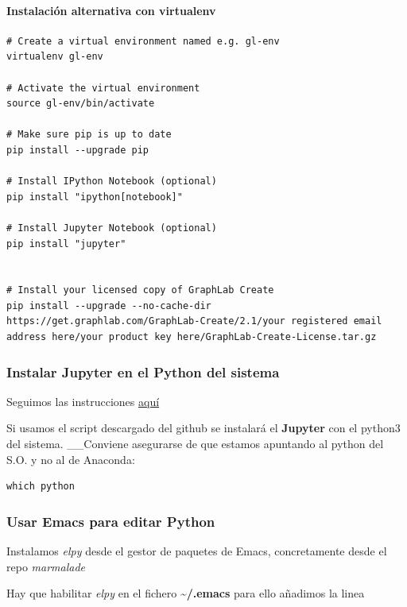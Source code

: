 \documentclass[12pt,spanish,]{scrartcl}
\let\oldparagraph\paragraph
\renewcommand{\paragraph}[1]{\oldparagraph{#1}\mbox{}}
\begin{document}
\paragraph{Instalación alternativa con
virtualenv}\label{instalaciuxf3n-alternativa-con-virtualenv}

\begin{verbatim}
# Create a virtual environment named e.g. gl-env
virtualenv gl-env

# Activate the virtual environment
source gl-env/bin/activate

# Make sure pip is up to date
pip install --upgrade pip

# Install IPython Notebook (optional)
pip install "ipython[notebook]"

# Install Jupyter Notebook (optional)
pip install "jupyter"


# Install your licensed copy of GraphLab Create
pip install --upgrade --no-cache-dir https://get.graphlab.com/GraphLab-Create/2.1/your registered email address here/your product key here/GraphLab-Create-License.tar.gz
\end{verbatim}

\subsubsection{Instalar Jupyter en el Python del
sistema}\label{instalar-jupyter-en-el-python-del-sistema}

Seguimos las instrucciones
\href{https://gist.github.com/frgomes/24c1923f2c9f14a27b14}{aquí}

Si usamos el script descargado del github se instalará el
\textbf{Jupyter} con el python3 del sistema. \_\_Conviene asegurarse de
que estamos apuntando al python del S.O. y no al de Anaconda:

\begin{verbatim}
which python
\end{verbatim}

\subsubsection{Usar Emacs para editar
Python}\label{usar-emacs-para-editar-python}

Instalamos \emph{elpy} desde el gestor de paquetes de Emacs,
concretamente desde el repo \emph{marmalade}

Hay que habilitar \emph{elpy} en el fichero
\textbf{\textasciitilde{}/.emacs} para ello añadimos la linea
\end{document}
